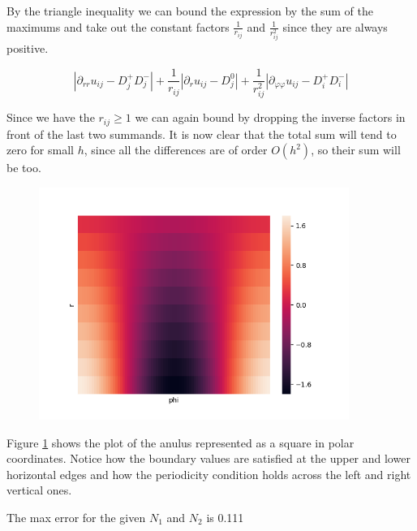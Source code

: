 By the triangle inequality we can bound the expression by the sum of the maximums and take out the constant factors $\frac{1}{r_{ij}}$ and $\frac{1}{r_{ij}^2}$ since they are always positive.

\begin{equation*}
    |\partial_{rr}u_{ij}-D^{+}_jD^{-}_j|
    +\frac{1}{r_{ij}}|\partial_{r}u_{ij}-D^{0}_j|
    +\frac{1}{r_{ij}^2}|\partial_{\varphi\varphi}u_{ij}-D^{+}_iD^{-}_i|
\end{equation*}

Since we have the $r_{ij}\geq 1$ we can again bound by dropping the inverse factors in front of the last two summands. It is now clear that the total sum will tend to zero for small $h$, since all the differences are of order $O(h^2)$, so their sum will be too.

%
\begin{figure}[H]
	\centering
	\includegraphics[width=0.9\textwidth]{Documentation/Figures/a06ex02c_uh.png} 
	\caption{}
	\label{fig:a06ex02c_uh}
\end{figure}

Figure \ref{fig:a06ex02c_uh} shows the plot of the anulus represented as a square in polar coordinates. Notice how the boundary values are satisfied at the upper and lower horizontal edges and how the periodicity condition holds across the left and right vertical ones.

The max error for the given $N_1$ and $N_2$ is 0.111

